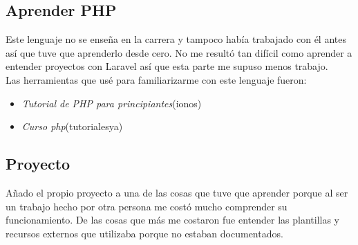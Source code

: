 \subsection{Aprender PHP} 
Este lenguaje no se enseña en la carrera y tampoco había trabajado con él antes así que tuve que aprenderlo desde cero. No me resultó tan difícil como aprender a entender proyectos con Laravel así que esta parte me supuso menos trabajo.\\
Las herramientas que usé para familiarizarme con este lenguaje fueron:
\begin{itemize}
    \item \textit{Tutorial de PHP para principiantes}(ionos)\cite{TutorialPHP}
    \item \textit{Curso php}(tutorialesya)\cite{CursoPHP} 
\end{itemize}
\subsection{Proyecto}
Añado el propio proyecto a una de las cosas que tuve que aprender porque al ser un trabajo hecho por otra persona me costó mucho comprender su funcionamiento. De las cosas que más me costaron fue entender las plantillas y recursos externos que utilizaba porque no estaban documentados.
